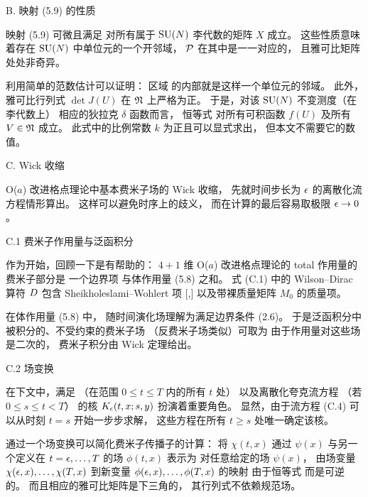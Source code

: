 \lusapp B. 映射 (5.9) 的性质

映射 (5.9) 可微且满足
对所有属于 ${\rm SU}(N)$ 李代数的矩阵 $X$ 成立。
这些性质意味着存在 ${\rm SU}(N)$ 中单位元的一个开邻域，
${\cal P}$ 在其中是一一对应的，
且雅可比矩阵
处处非奇异。

利用简单的范数估计可以证明：
区域
的内部就是这样一个单位元的邻域。
此外，雅可比行列式 $\det J(U)$ 在 $\mathfrak{N}$ 上严格为正。
于是，对该 ${\rm SU}(N)$ 不变测度（在李代数上）
相应的狄拉克 $\delta$ 函数而言，
恒等式
对所有可积函数 $f(U)$ 及所有 $V\in\mathfrak{N}$ 成立。
此式中的比例常数 $k$ 为正且可以显式求出，
但本文不需要它的数值。



\lusapp C. Wick 收缩

O($a$) 改进格点理论中基本费米子场的 Wick 收缩，
先就时间步长为 $\epsilon$ 的离散化流方程情形算出。
这样可以避免时序上的歧义，
而在计算的最后容易取极限 $\epsilon\to0$。


\lussubsec C.1 费米子作用量与泛函积分

作为开始，回顾一下是有帮助的：
$4+1$ 维 O($a$) 改进格点理论的 total 作用量的费米子部分是
一个边界项
与体作用量 (5.8) 之和。
式 (C.1) 中的 Wilson--Dirac 算符 $D$
包含 Sheikholeslami--Wohlert 项 [\cite{SW},\cite{SFimp}]
以及带裸质量矩阵 $M_0$ 的质量项。

在体作用量 (5.8) 中，
随时间演化场理解为满足边界条件 (2.6)。
于是泛函积分中被积分的、不受约束的费米子场
（反费米子场类似）可取为
由于作用量对这些场是二次的，
费米子积分由 Wick 定理给出。


\lussubsec C.2 场变换

在下文中，满足
（在范围 $0\leq t\leq T$ 内的所有 $t$ 处）
以及离散化夸克流方程
（若 $0\leq s\leq t<T$）
的核 $K_{\epsilon}(t,x;s,y)$ 扮演着重要角色。
显然，由于流方程 (C.4) 可以从时刻 $t=s$
开始一步步求解，
这些方程在所有 $t\geq s$ 处唯一确定该核。

通过一个场变换可以简化费米子传播子的计算：
将 $\chi(t,x)$ 通过 $\psi(x)$ 与另一个定义在
$t=\epsilon,\ldots,T$ 的场 $\phi(t,x)$ 表示为
对任意给定的场 $\psi(x)$，
由场变量 $\chi(\epsilon,x),\ldots,\chi(T,x)$
到新变量 $\phi(\epsilon,x),\ldots,\phi(T,x)$ 的映射
由于恒等式
而是可逆的。
而且相应的雅可比矩阵是下三角的，
其行列式不依赖规范场。

